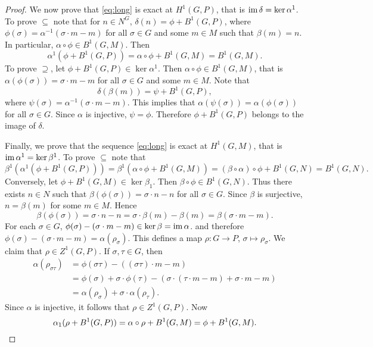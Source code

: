 \begin{proof}
    We now prove that \eqref{eq:long} is exact at $H^1(G,P)$, that 
    is $\operatorname{im}\delta=\ker\alpha^1$. To prove
    $\subseteq$ note that 
    for $n\in N^G$, $\delta(n)=\phi+B^1(G,P)$, where 
    $\phi(\sigma)=\alpha^{-1}(\sigma\cdot m-m)$ for all $\sigma\in G$
    and some $m\in M$ such that $\beta(m)=n$. In particular, 
    $\alpha\circ\phi\in B^1(G,M)$. 
    Then
    \[
    \alpha^1(\phi+B^1(G,P))=\alpha\circ\phi+B^1(G,M)=B^1(G,M).
    \]
    To prove $\supseteq$, let $\phi+B^1(G,P)\in\ker\alpha^1$. Then
    $\alpha\circ\phi\in B^1(G,M)$, that is $\alpha(\phi(\sigma))=\sigma\cdot m-m$ for 
    all $\sigma\in G$ and some $m\in M$. Note that 
    \[
    \delta(\beta(m))=\psi+B^1(G,P),
    \]
    where $\psi(\sigma)=\alpha^{-1}(\sigma\cdot m-m)$. This implies that 
    $\alpha(\psi(\sigma))=\alpha(\phi(\sigma))$ for all $\sigma\in G$. Since 
    $\alpha$ is injective, $\psi=\phi$. Therefore 
    $\phi+B^1(G,P)$ belongs to the image of $\delta$. 

    Finally, we prove that the sequence \eqref{eq:long} is exact
    at $H^1(G,M)$, that is $\operatorname{im}\alpha^1=\ker\beta^1$. To prove $\subseteq$  
    note that 
    \[
    \beta^1(\alpha^1(\phi+B^1(G,P)))=\beta^1(\alpha\circ\phi+B^1(G,M))
    =(\beta\circ\alpha)\circ\phi+B^1(G,N)=B^1(G,N).
    \]
    Conversely, let $\phi+B^1(G,M)\in\ker\beta_1$. Then $\beta\circ\phi\in B^1(G,N)$. Thus
    there exists $n\in N$ such that $\beta(\phi(\sigma))=\sigma\cdot n-n$ 
    for all $\sigma\in G$. Since $\beta$ is surjective, 
    $n=\beta(m)$ for some $m\in M$. Hence 
    \[
    \beta(\phi(\sigma))=\sigma\cdot n-n=\sigma\cdot \beta(m)-\beta(m)
    =\beta(\sigma\cdot m-m).
    \]
    For each $\sigma\in G$, 
    $\phi(\sigma)-(\sigma\cdot m-m)\in\ker\beta=\operatorname{im}\alpha$. 
    and therefore  $\phi(\sigma)-(\sigma\cdot m-m)=\alpha(\rho_\sigma)$. 
    This defines a map $\rho\colon G\to P$, $\sigma\mapsto\rho_\sigma$.
    We claim that $\rho\in Z^1(G,P)$. If $\sigma,\tau\in G$, then
    \begin{align*}    
    \alpha(\rho_{\sigma\tau})&=\phi(\sigma\tau)-( (\sigma\tau)\cdot m-m)\\
    &=\phi(\sigma)+\sigma\cdot\phi(\tau)-(\sigma\cdot (\tau\cdot m-m)+\sigma\cdot m-m)\\
    &=\alpha(\rho_\sigma)+\sigma\cdot\alpha(\rho_\tau).
    \end{align*}
    Since $\alpha$ is injective, it follows that $\rho\in Z^1(G,P)$.
    Now
    \[
    \alpha_1(\rho+B^1(G,P))=\alpha\circ\rho+B^1(G,M)=\phi+B^1(G,M).\qedhere
    \]
\end{proof}

